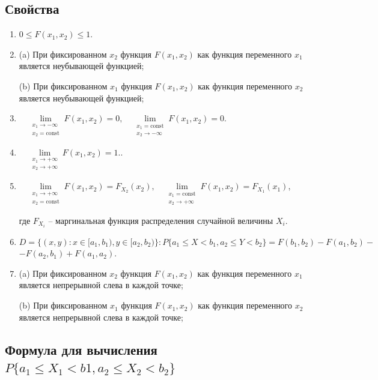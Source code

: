 \subsection*{Свойства}
\begin{enumerate}
	\item $0 \leq F(x_1, x_2) \leq 1$.
	
	\item (a) При фиксированном $x_2$ функция $F(x_1, x_2)$ как функция переменного $x_1$
	является неубывающей функцией;
	
	(b) При фиксированном $x_1$ функция $F(x_1, x_2)$ как функция переменного $x_2$
	является неубывающей функцией;
	
	\item $\quad \lim\limits_{\substack{x_1 \to -\infty \\ x_2 = \text{const}}} F(x_1, x_2) = 0, \quad \lim\limits_{\substack{x_1 = \text{const} \\ x_2 \to -\infty}} F(x_1, x_2) = 0$.
	
	\item $\quad \lim\limits_{\substack{x_1 \to +\infty \\ x_2 \to +\infty}} F(x_1, x_2) = 1.$.
	
	\item $\quad \lim\limits_{{\substack{x_1 \to +\infty \\ x_2 = \text{const}}}} F(x_1, x_2) = F_{X_2}(x_2), \quad \lim\limits_{\substack{x_1 = \text{const} \\ x_2 \to +\infty}} F(x_1, x_2) = F_{X_1}(x_1)$, 
	
	где $F_{X_i}$ -- маргинальная функция распределения случайной величины $X_i$.
	
	\item $D = \{(x, y): x \in [a_1, b_1), y \in [a_2, b_2)\}: P\{a_1 \leq X < b_1, a_2 \leq Y < b_2\} = F(b_1, b_2) - F(a_1, b_2) -$ $-F(a_2, b_1) + F(a_1, a_2)$.
	
	\item (a) При фиксированном $x_2$ функция $F(x_1, x_2)$ как функция переменного $x_1$
	является непрерывной слева в каждой точке;
	
	(b) При фиксированном $x_1$ функция $F(x_1, x_2)$ как функция переменного $x_2$
	является непрерывной слева в каждой точке;
	
\end{enumerate}

\subsection*{Формула для вычисления $P\{a_1 \leq X_1 < b1, a_2 \leq X_2 < b_2\}$}

